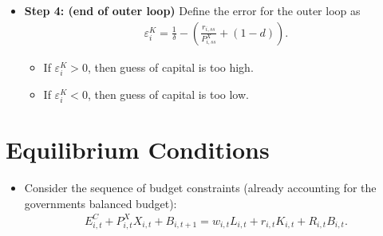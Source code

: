 \documentclass{article}
\begin{document}
\begin{itemize}
\begin{itemize}
        \begin{itemize}
            \item If $\vert \varepsilon^{w} \rvert>tol$ where $tol$ is a small number which determines our tolerance on the error (e.g. $10^{-6}$), then compute an update for wages, $w_{i,ss}^{up}$, as follows and go back to \textbf{Step 2} with the new guess for wages given by the update:
            \begin{align*}
                \begin{bmatrix}
                    w_{US,ss}^{up} \\ w_{RW,ss}^{up} 
                \end{bmatrix}
                =
                \begin{bmatrix}
                    w_{US,ss}(1-\varepsilon^{w}) \\ w_{RW,ss}(1+\varepsilon^{w}) 
                \end{bmatrix}.
            \end{align*}
            \item If $\vert \varepsilon^{w} \rvert<tol$, then proceed to \textbf{Step 4}.
        \end{itemize}
        \item \textbf{Step 4: (end of outer loop)} Define the error for the outer loop as
        \begin{align*}
            \varepsilon_{i}^{K} = \frac{1}{\delta} - \left( \frac{r_{i,ss}}{P_{i,ss}^{X}} + (1-d) \right).
        \end{align*}
        \begin{itemize}
            \item If $\varepsilon_{i}^{K}>0$, then guess of capital is too high.
            \item If $\varepsilon_{i}^{K}<0$, then guess of capital is too low.
        \end{itemize}
    \end{itemize}
\end{itemize}

\newpage
\section{Equilibrium Conditions}
\label{sec:EqConditions}

\begin{itemize}
    \item Consider the sequence of budget constraints (already accounting for the governments balanced budget):
    \begin{align*}
        E^C_{i,t} + P^X_{i,t}X_{i,t} + B_{i,t+1} = w_{i,t}L_{i,t} + r_{i,t}K_{i,t} + R_{i,t}B_{i,t}.
    \end{align*}
    
\end{itemize}
\end{document}
